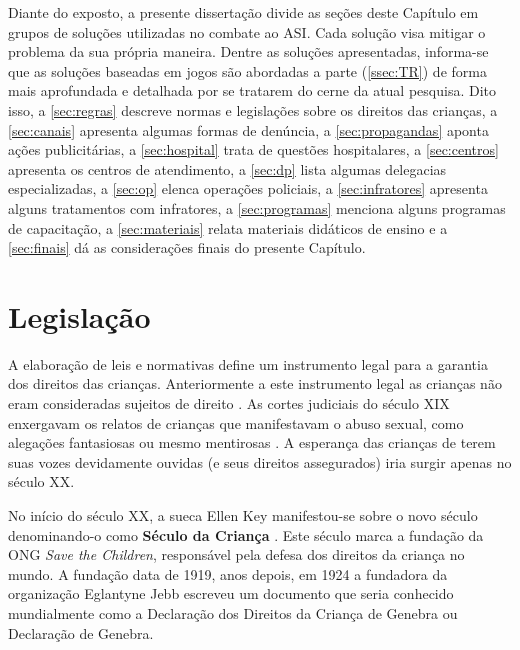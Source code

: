 Diante do exposto, a presente dissertação divide as seções deste Capítulo em grupos de soluções utilizadas no combate ao \ac{ASI}. Cada solução visa mitigar o problema da sua própria maneira. Dentre as soluções apresentadas, informa-se que as soluções baseadas em jogos são abordadas a parte (\autoref{ssec:TR}) de forma mais aprofundada e detalhada por se tratarem do cerne da atual pesquisa. Dito isso, a \autoref{sec:regras} descreve normas e legislações sobre os direitos das crianças, a \autoref{sec:canais} apresenta algumas formas de denúncia, a \autoref{sec:propagandas} aponta ações publicitárias, a \autoref{sec:hospital} trata de questões hospitalares, a \autoref{sec:centros} apresenta os centros de atendimento, a \autoref{sec:dp} lista algumas delegacias especializadas, a \autoref{sec:op} elenca operações policiais, a \autoref{sec:infratores} apresenta alguns tratamentos com infratores, a \autoref{sec:programas} menciona alguns programas de capacitação, a \autoref{sec:materiais} relata materiais didáticos de ensino e a \autoref{sec:finais} dá as considerações finais do presente Capítulo. 


\section{Legislação}\label{sec:regras}

A elaboração de leis e normativas define um instrumento legal para a garantia dos direitos das crianças. Anteriormente a este instrumento legal as crianças não eram consideradas sujeitos de direito . As cortes judiciais do século XIX enxergavam os relatos de crianças que manifestavam o abuso sexual, como alegações fantasiosas ou mesmo mentirosas \cite{aded2006abuso}. A esperança das crianças de terem suas vozes devidamente ouvidas (e seus direitos assegurados) iria surgir apenas no século XX.

No início do século XX, a sueca Ellen Key manifestou-se sobre o novo século denominando-o como \textbf{Século da Criança} \cite{sandin1999imagens, hayes2002children, junior2016olhares}. Este século marca a fundação da \ac{ONG} \textit{Save the Children}, responsável pela defesa dos direitos da criança no mundo. A fundação data de 1919, anos depois, em 1924 a fundadora da organização Eglantyne Jebb escreveu um documento que seria conhecido mundialmente como a Declaração dos Direitos da Criança de Genebra ou Declaração de Genebra.

